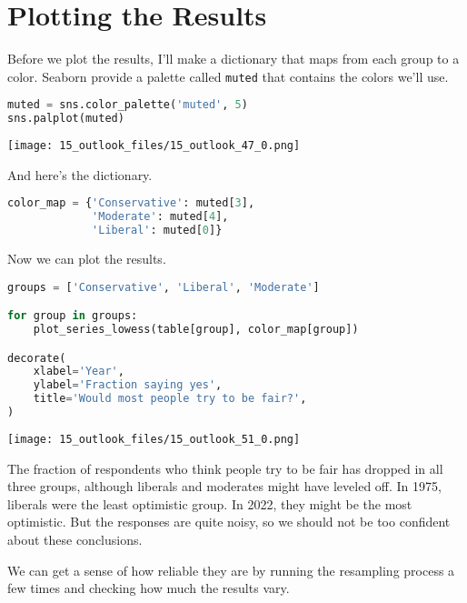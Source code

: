 \section{Plotting the Results}\label{plotting-the-results}

Before we plot the results, I'll make a dictionary that maps from each
group to a color. Seaborn provide a palette called
\passthrough{\lstinline!muted!} that contains the colors we'll use.

\begin{lstlisting}[language=Python,style=source]
muted = sns.color_palette('muted', 5)
sns.palplot(muted)
\end{lstlisting}

\begin{center}
\texttt{[image: 15\_outlook\_files/15\_outlook\_47\_0.png]}
\end{center}

And here's the dictionary.

\begin{lstlisting}[language=Python,style=source]
color_map = {'Conservative': muted[3],
             'Moderate': muted[4],
             'Liberal': muted[0]}
\end{lstlisting}

Now we can plot the results.

\begin{lstlisting}[language=Python,style=source]
groups = ['Conservative', 'Liberal', 'Moderate']

for group in groups:
    plot_series_lowess(table[group], color_map[group])

decorate(
    xlabel='Year',
    ylabel='Fraction saying yes',
    title='Would most people try to be fair?',
)
\end{lstlisting}

\begin{center}
\texttt{[image: 15\_outlook\_files/15\_outlook\_51\_0.png]}
\end{center}

The fraction of respondents who think people try to be fair has dropped
in all three groups, although liberals and moderates might have leveled
off. In 1975, liberals were the least optimistic group. In 2022, they
might be the most optimistic. But the responses are quite noisy, so we
should not be too confident about these conclusions.

We can get a sense of how reliable they are by running the resampling
process a few times and checking how much the results vary.

